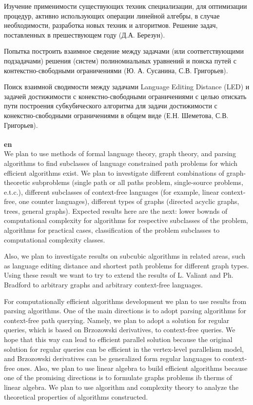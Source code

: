 \documentclass[12pt]{article}  %
\theoremstyle{remark}
\begin{document}
Изучение применимости существующих техник специализации, для оптимизации процедур, активно использующих операции линейной алгебры, в случае необходимости, разработка новых техник и алгоритмов. Решение задач, поставленных в прешествующем году (Д.А. Березун).

Попытка построить взаимное сведение между задачами (или соответствующими подзадачами) решения (систем) полиномиальных уравнений и поиска путей с контекстно-свободными ограничениями (Ю. А. Сусанина, С.В. Григорьев).

Поиск взаимной сводимости между задачами Language Editing Distance (LED) и задачей достижимости с конекстно-свободными ограничениями с целью отискать пути построения субкубического алгоритма для задачи достижимости с конекстно-свободными ограничениями в общем виде (Е.Н. Шеметова, С.В. Григорьев).
\\
\\
\textbf{en}\\
We plan to use methods of formal language theory, graph theory, and parsing algorithms to find subclasses of language constrained path problems for which efficient algorithms exist.
We plan to investigate different combinations of graph-theoretic subproblems (single path or all paths problem, single-source problems, e.t.c.), different subclasses of context-free languages (for example, linear context-free, one counter languages), different types of graphs (directed acyclic graphs, trees, general graphs).
Expected results here are the next: lower bownds of computational complexity for algorithms for respective subclasses of the problem, algorithms for practical cases, classification of the problem subclasses to computational complexity classes.

Also, we plan to investigate results on subcubic algorithms in related areas, such as language editing distance and shortest path problems for different graph types. Using these result we want to try to extend the results of L. Valiant and Ph. Bradford to arbitrary graphs and arbitrary context-free languages.

For computationally efficient algorithms development we plan to use results from parsing algorithms.
One of the main directions is to adopt parsing algorithms for context-free path querying.
Namely, we plan to adopt a solution for regular queries, which is based on Brzozowski derivatives, to context-free queries.
We hope that this way can lead to efficient parallel solution because the original solution for regular queries can be efficient in the vertex-level parallelism model, and Brzozowski derivatives can be generalized form regular languages to context-free ones.
Also, we plan to use linear algebra to build efficient algorithms because one of the promising directions is to formulate graphs problems ib therms of linear algebra.
We plan to use algorithm and complexity theory to analyze the theoretical properties of algorithms constructed.
\end{document}
